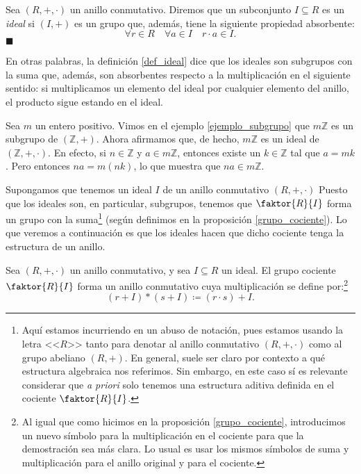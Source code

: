 \begin{definition}[Ideal] \label{def_ideal}
Sea $(R, +, \cdot)$ un anillo conmutativo. Diremos que un subconjunto $I \subseteq R$ es un \emph{ideal} si $(I, +)$ es un grupo que, además, tiene la siguiente propiedad absorbente:
$$\forall r \in R \quad \forall a \in I \quad r \cdot a \in I.$$
\hfill$\blacksquare$
\end{definition}

En otras palabras, la definición \ref{def_ideal} dice que los ideales son subgrupos con la suma que, además, son absorbentes respecto a la multiplicación en el siguiente sentido: si multiplicamos un elemento del ideal por cualquier elemento del anillo, el producto sigue estando en el ideal.

\begin{example} \label{mZ_ideal}
Sea $m$ un entero positivo. Vimos en el ejemplo \ref{ejemplo_subgrupo} que $m\mathbb{Z}$ es un subgrupo de $(\mathbb{Z}, +)$. Ahora afirmamos que, de hecho, $m \mathbb{Z}$ es un ideal de $(\mathbb{Z}, +, \cdot)$. En efecto, si $n \in \mathbb{Z}$ y $a \in m\mathbb{Z}$, entonces existe un $k \in \mathbb{Z}$ tal que $a = mk$. Pero entonces $na = m(nk)$, lo que muestra que $na \in m\mathbb{Z}$. 
\end{example}

Supongamos que tenemos un ideal $I$ de un anillo conmutativo $(R, +, \cdot)$
Puesto que los ideales son, en particular, subgrupos, tenemos que $\faktor{R}{I}$ forma un grupo con la suma\footnote{Aquí estamos incurriendo en un abuso de notación, pues estamos usando la letra <<$R$>> tanto para denotar al anillo conmutativo $(R, +, \cdot)$ como al grupo abeliano $(R, +)$. En general, suele ser claro por contexto a qué estructura algebraica nos referimos. Sin embargo, en este caso sí es relevante considerar que \textit{a priori} solo tenemos una estructura aditiva definida en el cociente $\faktor{R}{I}$.} (según definimos en la proposición \ref{grupo_cociente}). Lo que veremos a continuación es que los ideales hacen que dicho cociente tenga la estructura de un anillo.

\begin{prop} \label{anillo_cociente}
Sea $(R, +, \cdot)$ un anillo conmutativo, y sea $I \subseteq R$ un ideal. El grupo cociente $\faktor{R}{I}$ forma un anillo conmutativo cuya multiplicación se define por:\footnote{Al igual que como hicimos en la proposición \ref{grupo_cociente}, introducimos un nuevo símbolo para la multiplicación en el cociente para que la demostración sea más clara. Lo usual es usar los mismos símbolos de suma y multiplicación para el anillo original y para el cociente.}
$$(r + I) \ast (s + I) \coloneqq (r \cdot s) + I.$$
\end{prop}

